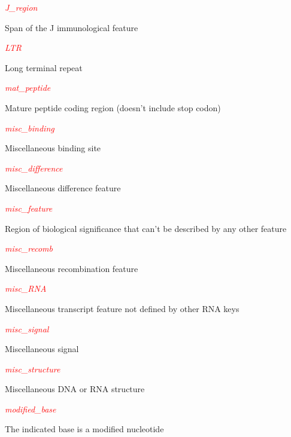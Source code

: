 \textcolor{red}{\textit{J\_region}}
\begin{adjustwidth}{2em}{}
Span of the J immunological feature
\end{adjustwidth}

\textcolor{red}{\textit{LTR}}
\begin{adjustwidth}{2em}{}
Long terminal repeat
\end{adjustwidth}

\textcolor{red}{\textit{mat\_peptide}}
\begin{adjustwidth}{2em}{}
Mature peptide coding region (doesn't include stop codon)
\end{adjustwidth}

\textcolor{red}{\textit{misc\_binding}}
\begin{adjustwidth}{2em}{}
Miscellaneous binding site
\end{adjustwidth}

\textcolor{red}{\textit{misc\_difference}}
\begin{adjustwidth}{2em}{}
Miscellaneous difference feature
\end{adjustwidth}

\textcolor{red}{\textit{misc\_feature}}
\begin{adjustwidth}{2em}{}
Region of biological significance that can't be described by any other feature
\end{adjustwidth}

\textcolor{red}{\textit{misc\_recomb}}
\begin{adjustwidth}{2em}{}
Miscellaneous recombination feature
\end{adjustwidth}

\textcolor{red}{\textit{misc\_RNA}}
\begin{adjustwidth}{2em}{}
Miscellaneous transcript feature not defined by other RNA keys
\end{adjustwidth}

\textcolor{red}{\textit{misc\_signal}}
\begin{adjustwidth}{2em}{}
Miscellaneous signal
\end{adjustwidth}

\textcolor{red}{\textit{misc\_structure}}
\begin{adjustwidth}{2em}{}
Miscellaneous DNA or RNA structure
\end{adjustwidth}

\textcolor{red}{\textit{modified\_base}}
\begin{adjustwidth}{2em}{}
The indicated base is a modified nucleotide
\end{adjustwidth}

